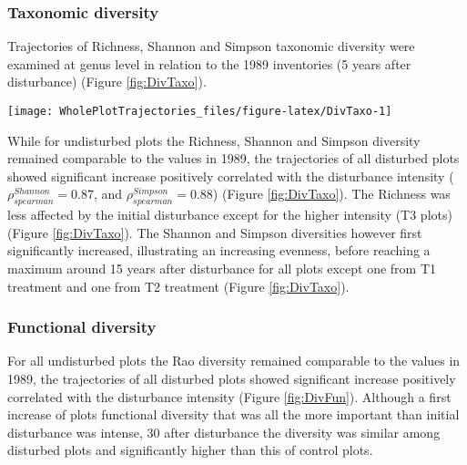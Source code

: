 \documentclass[fleqn,10pt]{ArtEcoFoG} %
\theoremstyle{definition}
\theoremstyle{definition}
\theoremstyle{definition}
\theoremstyle{remark}
\begin{document}
\subsubsection{Taxonomic diversity}\label{taxonomic-diversity}

Trajectories of Richness, Shannon and Simpson taxonomic diversity were
examined at genus level in relation to the 1989 inventories (5 years
after disturbance) (Figure \ref{fig:DivTaxo}).

\begin{figure*}

{\centering \texttt{[image: WholePlotTrajectories\_files/figure-latex/DivTaxo-1]} 

}

\caption{Trajectories of the difference to the 1989 inventories (5 years after disturbance) over 30 years after disturbance of plots communities \textbf{(a)} Richness, \textbf{(b)} Shannon and \textbf{(c)} Simpson diversities. Trajectories correspond to the median (solid line) and 0.025 and 0.975 percentile (gray envelope) observed after 50 iteration of the taxonomic uncertainty propagation. Initial treatments are represented by solid lines colors with green for control, blue for T1,orange for T2 and red for T3.}\label{fig:DivTaxo}
\end{figure*}

While for undisturbed plots the Richness, Shannon and Simpson diversity
remained comparable to the values in 1989, the trajectories of all
disturbed plots showed significant increase positively correlated with
the disturbance intensity (\(\rho_{spearman}^{Shannon}=0.87\), and
\(\rho_{spearman}^{Simpson}=0.88\)) (Figure \ref{fig:DivTaxo}). The
Richness was less affected by the initial disturbance except for the
higher intensity (T3 plots) (Figure \ref{fig:DivTaxo}). The Shannon and
Simpson diversities however first significantly increased, illustrating
an increasing evenness, before reaching a maximum around 15 years after
disturbance for all plots except one from T1 treatment and one from T2
treatment (Figure \ref{fig:DivTaxo}).

\subsubsection{Functional diversity}\label{functional-diversity}

For all undisturbed plots the Rao diversity remained comparable to the
values in 1989, the trajectories of all disturbed plots showed
significant increase positively correlated with the disturbance
intensity (Figure \ref{fig:DivFun}). Although a first increase of plots
functional diversity that was all the more important than initial
disturbance was intense, 30 after disturbance the diversity was similar
among disturbed plots and significantly higher than this of control
plots.
\end{document}
